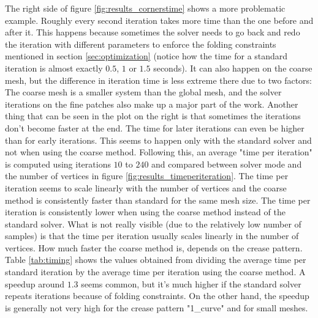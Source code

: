 \documentclass[a4paper,twoside,12pt,nochapterprefix]{scrbook}
\begin{document}
The right side of figure \ref{fig:results_cornerstime} shows a more problematic example. Roughly every second iteration takes more time than the one before and after it. This happens because sometimes the solver needs to go back and redo the iteration with different parameters to enforce the folding constraints mentioned in section \ref{sec:optimization} (notice how the time for a standard iteration is almost exactly $0.5$, $1$ or $1.5$ seconds). It can also happen on the coarse mesh, but the difference in iteration time is less extreme there due to two factors: The coarse mesh is a smaller system than the global mesh, and the solver iterations on the fine patches also make up a major part of the work.\newline
Another thing that can be seen in the plot on the right is that sometimes the iterations don't become faster at the end. The time for later iterations can even be higher than for early iterations. This seems to happen only with the standard solver and not when using the coarse method.\newline
Following this, an average "time per iteration" is computed using iterations $10$ to $240$ and compared between solver mode and the number of vertices in figure \ref{fig:results_timeperiteration}. The time per iteration seems to scale linearly with the number of vertices and the coarse method is consistently faster than standard for the same mesh size.\newline
The time per iteration is consistently lower when using the coarse method instead of the standard solver. What is not really visible (due to the relatively low number of samples) is that the time per iteration usually scales linearly in the number of vertices. How much faster the coarse method is, depends on the crease pattern. Table \ref{tab:timing} shows the values obtained from dividing the average time per standard iteration by the average time per iteration using the coarse method. A speedup around $1.3$ seems common, but it's much higher if the standard solver repeats iterations because of folding constraints. On the other hand, the speedup is generally not very high for the crease pattern "1\_curve" and for small meshes.\newline
\end{document}
